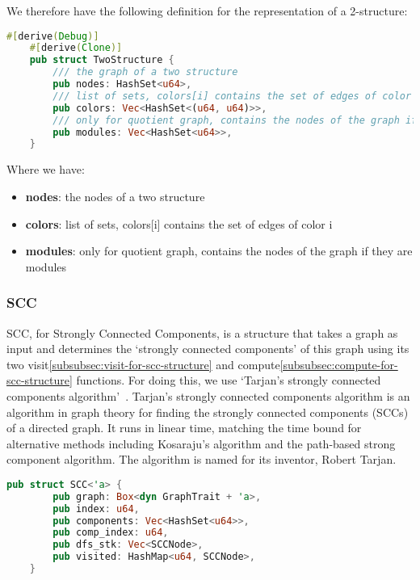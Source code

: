 We therefore have the following definition for the representation of a 2-structure:
\begin{lstlisting}[language=Rust, style=rust, caption={Defining the 2-structure}, label={lst:rust-define-twostructure}, firstnumber=1]
    #[derive(Debug)]
    #[derive(Clone)]
    pub struct TwoStructure {
        /// the graph of a two structure
        pub nodes: HashSet<u64>,
        /// list of sets, colors[i] contains the set of edges of color i
        pub colors: Vec<HashSet<(u64, u64)>>,
        /// only for quotient graph, contains the nodes of the graph if they are modules
        pub modules: Vec<HashSet<u64>>,
    }
\end{lstlisting}
Where we have:
\begin{itemize}
    \item \textbf{nodes}: the nodes of a two structure
    \item \textbf{colors}: list of sets, colors[i] contains the set of edges of color i
    \item \textbf{modules}: only for quotient graph, contains the nodes of the graph if they are modules
\end{itemize}

\subsubsection{SCC}

SCC, for Strongly Connected Components, is a structure that takes a graph as input and determines the `strongly connected components' of this graph using its two visit\ref{subsubsec:visit-for-scc-structure} and compute\ref{subsubsec:compute-for-scc-structure} functions.
For doing this, we use `Tarjan's strongly connected components algorithm'~\cite{sccalgowikipedia}.
Tarjan's strongly connected components algorithm is an algorithm in graph theory for finding the strongly connected components (SCCs) of a directed graph.
It runs in linear time, matching the time bound for alternative methods including Kosaraju's algorithm and the path-based strong component algorithm.
The algorithm is named for its inventor, Robert Tarjan.

\begin{lstlisting}[language=Rust, style=rust, caption={Defining the SCC}, label={lst:rust-define-scc}, firstnumber=1]
    pub struct SCC<'a> {
        pub graph: Box<dyn GraphTrait + 'a>,
        pub index: u64,
        pub components: Vec<HashSet<u64>>,
        pub comp_index: u64,
        pub dfs_stk: Vec<SCCNode>,
        pub visited: HashMap<u64, SCCNode>,
    }
\end{lstlisting}


